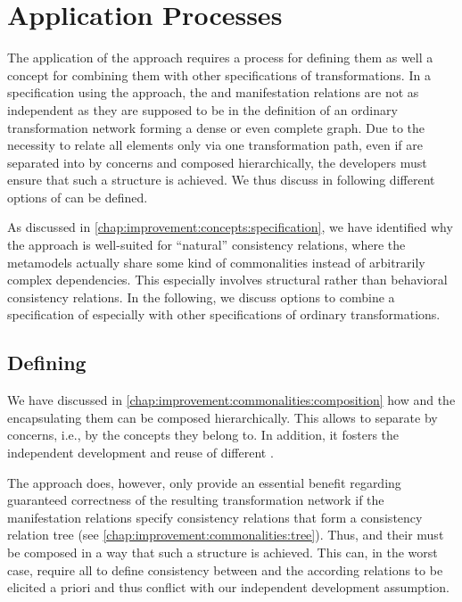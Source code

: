 \section{Application Processes}
\label{chap:improvement:application}

The application of the \commonalities approach requires a process for defining them as well a concept for combining them with other specifications of transformations.
In a specification using the \commonalities approach, the \conceptmetamodels and manifestation relations are not as independent as they are supposed to be in the definition of an ordinary transformation network forming a dense or even complete graph.
Due to the necessity to relate all elements only via one transformation path, even if \commonalities are separated into \conceptmetamodels by concerns and composed hierarchically, the developers must ensure that such a structure is achieved.
We thus discuss in following different options of \commonalities can be defined.

As discussed in \autoref{chap:improvement:concepts:specification}, we have identified why the \commonalities approach is well-suited for \enquote{natural} consistency relations, where the metamodels actually share some kind of commonalities instead of arbitrarily complex dependencies.
This especially involves structural rather than behavioral consistency relations.
In the following, we discuss options to combine a specification of \commonalities especially with other specifications of ordinary transformations.


\subsection{Defining \commonalities}

We have discussed in \autoref{chap:improvement:commonalities:composition} how \commonalities and the \conceptmetamodels encapsulating them can be composed hierarchically.
This allows to separate \commonalities by concerns, i.e., by the concepts they belong to.
In addition, it fosters the independent development and reuse of different \conceptmetamodels.

The \commonalities approach does, however, only provide an essential benefit regarding guaranteed correctness of the resulting transformation network if the manifestation relations specify consistency relations that form a consistency relation tree (see \autoref{chap:improvement:commonalities:tree}).
Thus, \commonalities and their \conceptmetamodels must be composed in a way that such a structure is achieved.
This can, in the worst case, require all \concretemetamodels to define consistency between and the according relations to be elicited a priori and thus conflict with our independent development assumption.

